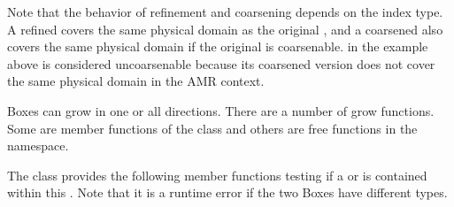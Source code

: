 \documentclass[letterpaper,10pt,english]{sphinxmanual}
\begin{document}
\begin{sphinxVerbatim}[commandchars=\\\{\}]
   
   
    
\end{sphinxVerbatim}

\sphinxAtStartPar
Note that the behavior of refinement and coarsening depends on the
index type.  A refined  covers the same physical domain as
the original , and a coarsened  also covers the
same physical domain if the original  is coarsenable.
 in the example above is considered
uncoarsenable because its coarsened version does not cover the same
physical domain in the AMR context.

\sphinxAtStartPar
Boxes can grow in one or all directions.  There are a number of grow functions.
Some are member functions of the  class and others are free
functions in the  namespace.

\sphinxAtStartPar
The  class provides the following member functions testing if a
 or  is contained within this . Note that it
is a runtime error if the two Boxes have different types.

\begin{sphinxVerbatim}[commandchars=\\\{\}]
     
     
     
     
\end{sphinxVerbatim}
\end{document}
